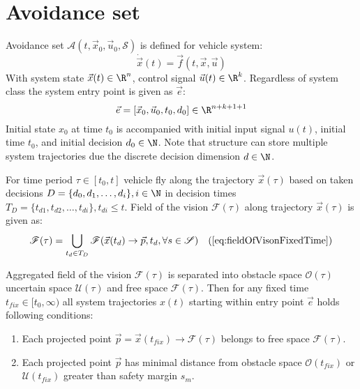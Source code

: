 \section{Avoidance set}\label{s:AvoidanceSet}
    \begin{definition}{Avoidance set $\mathscr{A}(t,\vec{x}_0,\vec{u}_0,\mathscr{S})$} is defined for vehicle system:
    \begin{equation}
        \dot{\vec{x}}(t)=\vec{f}(t,\vec{x},\vec{u})
    \end{equation}
    With system state $\vec{x}(t)\in\R^n$, control signal $\vec{u}(t)\in\R^k$. Regardless of system class the system entry point is given as $\vec{e}$:
    \begin{equation}
        \vec{e}= [\vec{x}_0,\vec{u}_0,t_0,d_0]\in\R^{n+k+1+1}
    \end{equation}
    Initial state $x_0$ at time $t_0$ is accompanied with initial input signal $u(t)$, initial time $t_0$, and initial decision $d_0\in\N$. Note that structure can store multiple system trajectories due the discrete decision dimension $d\in\N$.
    
    For time period $\tau\in[t_0,t]$ vehicle fly along the trajectory $\vec{x}(\tau)$ based on taken decisions $D=\{d_0,d_1,\dots,d_i\},i\in\N$ in decision times $T_D=\{t_{d1},t_{d2},\dots,t_{di}\}, t_{di}\le t$. Field of the vision $\mathscr{F}(\tau)$ along trajectory $\vec{x}(\tau)$ is given as:
    \begin{equation}
        \mathscr{F}(\tau) = \bigcup_{t_d\in T_D} \mathscr{F}(\vec{x}(t_d)\to\vec{p},t_d,\forall s\in\mathscr{S}) \quad (\ref{eq:fieldOfVisonFixedTime})
    \end{equation}
    \end{definition}
    Aggregated field of the vision $\mathscr{F}(\tau)$ is separated into obstacle space $\mathscr{O}(\tau)$ uncertain space $\mathscr{U}(\tau)$ and free space $\mathscr{F}(\tau)$. Then for any fixed time $t_{fix}\in[t_0,\infty)$ all system trajectories $x(t)$ starting within entry point $\vec{e}$ holds following conditions:
    \begin{enumerate}
        \item Each projected point $\vec{p}=\vec{x}(t_{fix})\to\mathscr{F}(\tau)$ belongs to free space $\mathscr{F}(\tau)$.
        \item Each projected point $\vec{p}$ has minimal distance from obstacle space $\mathscr{O}(t_{fix})$ or $\mathscr{U}(t_{fix})$ greater than safety margin $s_m$.
    \end{enumerate}
    
